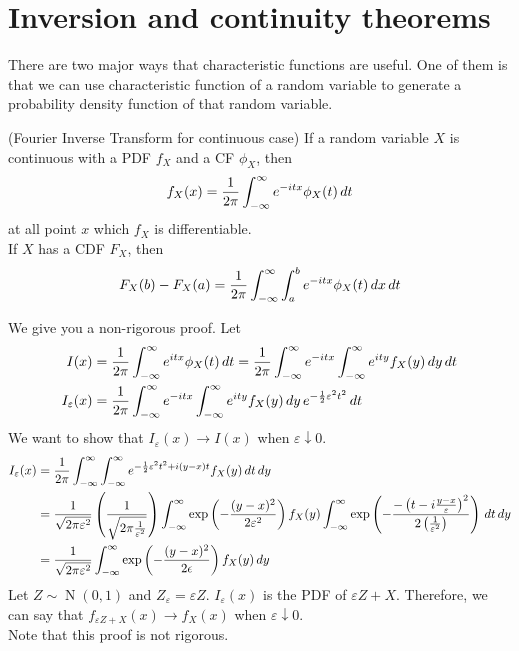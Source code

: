 \documentclass{huhtakm-template-book}
\DeclareMathOperator{\N}{N}
\begin{document}
\section{Inversion and continuity theorems}
    There are two major ways that characteristic functions are useful. One of them is that we can use characteristic function of a random variable to generate a probability density function of that random variable.
    \begin{thm}(Fourier Inverse Transform for continuous case)
        If a random variable $X$ is continuous with a PDF $f_{X}$ and a CF $\phi_{X}$, then
        \begin{equation*}
            f_{X}(x)=\frac{1}{2\pi}\int_{-\infty}^{\infty} e^{-itx}\phi_{X}(t)\,dt
        \end{equation*}
        at all point $x$ which $f_{X}$ is differentiable.\\
        If $X$ has a CDF $F_{X}$, then
        \begin{equation*}
            F_{X}(b)-F_{X}(a)=\frac{1}{2\pi}\int_{-\infty}^{\infty}\int_{a}^{b}e^{-itx}\phi_{X}(t)\,dx\,dt
        \end{equation*}
    \end{thm}
    \begin{proofing}
        We give you a non-rigorous proof. Let
        \begin{align*}
            I(x)&=\frac{1}{2\pi}\int_{-\infty}^{\infty} e^{itx}\phi_{X}(t)\,dt=\frac{1}{2\pi}\int_{-\infty}^{\infty} e^{-itx}\int_{-\infty}^{\infty} e^{ity}f_{X}(y)\,dy\,dt\\
            I_{\varepsilon}(x)&=\frac{1}{2\pi}\int_{-\infty}^{\infty} e^{-itx}\int_{-\infty}^{\infty} e^{ity}f_{X}(y)\,dy\,e^{-\frac{1}{2}\varepsilon^{2}t^{2}}\,dt
        \end{align*}
        We want to show that $I_{\varepsilon}(x)\to I(x)$ when $\varepsilon\downarrow 0$.
        \begin{align*}
            I_{\varepsilon}(x)&=\frac{1}{2\pi}\int_{-\infty}^{\infty}\int_{-\infty}^{\infty} e^{-\frac{1}{2}\varepsilon^{2}t^{2}+i(y-x)t}f_{X}(y)\,dt\,dy\\
            &=\frac{1}{\sqrt{2\pi\varepsilon^{2}}}\left(\frac{1}{\sqrt{2\pi\frac{1}{\varepsilon^{2}}}}\right)\int_{-\infty}^{\infty}\exp\left(-\frac{(y-x)^{2}}{2\varepsilon^{2}}\right)f_{X}(y)\int_{-\infty}^{\infty}\exp\left(-\frac{-\left(t-i\frac{y-x}{\varepsilon}\right)^{2}}{2\left(\frac{1}{\varepsilon^{2}}\right)}\right)\,dt\,dy\\
            &=\frac{1}{\sqrt{2\pi\varepsilon^{2}}}\int_{-\infty}^{\infty}\exp\left(-\frac{(y-x)^{2}}{2\epsilon}\right)f_{X}(y)\,dy
        \end{align*}
        Let $Z\sim\N(0,1)$ and $Z_{\varepsilon}=\varepsilon Z$. $I_{\varepsilon}(x)$ is the PDF of $\varepsilon Z+X$. Therefore, we can say that $f_{\varepsilon Z+X}(x)\to f_{X}(x)$ when $\varepsilon\downarrow 0$.\\
        Note that this proof is not rigorous.
    \end{proofing}
\end{document}
